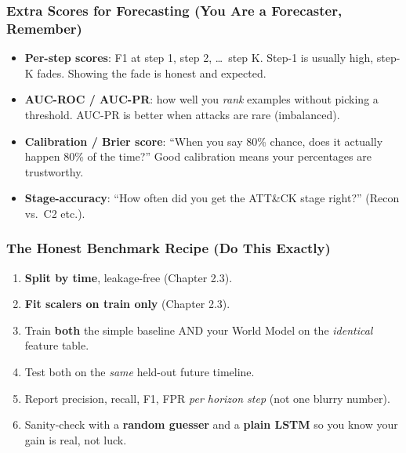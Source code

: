 \documentclass[11pt,a4paper]{article}
\begin{document}
\subsubsection{Extra Scores for Forecasting (You Are a Forecaster, Remember)}

\begin{itemize}[leftmargin=1.6em,itemsep=2pt]
  \item \textbf{Per-step scores}: F1 at step 1, step 2, \dots\ step K. Step-1 is
usually high, step-K fades. Showing the fade is honest and expected.

  \item \textbf{AUC-ROC / AUC-PR}: how well you \emph{rank} examples without
picking a threshold. AUC-PR is better when attacks are rare (imbalanced).

  \item \textbf{Calibration / Brier score}: ``When you say 80\% chance, does it
actually happen 80\% of the time?'' Good calibration means your
percentages are trustworthy.

  \item \textbf{Stage-accuracy}: ``How often did you get the ATT\&CK stage right?''
(Recon vs.\ C2 etc.).
\end{itemize}

\subsubsection{The Honest Benchmark Recipe (Do This Exactly)}

\begin{enumerate}[leftmargin=1.8em,itemsep=2pt]
  \item \textbf{Split by time}, leakage-free (Chapter 2.3).
  \item \textbf{Fit scalers on train only} (Chapter 2.3).
  \item Train \textbf{both} the simple baseline AND your World Model on the
\emph{identical} feature table.
  \item Test both on the \emph{same} held-out future timeline.
  \item Report precision, recall, F1, FPR \emph{per horizon step} (not one
blurry number).
  \item Sanity-check with a \textbf{random guesser} and a \textbf{plain LSTM}
so you know your gain is real, not luck.
\end{enumerate}
\end{document}
